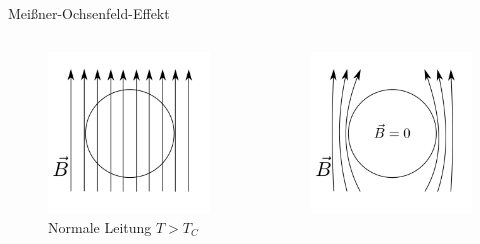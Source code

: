\begin{frame}{Meißner-Ochsenfeld-Effekt}
\begin{columns}
\begin{column}{0.49\textwidth}
  \begin{figure}
    \includegraphics[width = \textwidth]{supra_1.pdf}
    \caption{Normale Leitung $T > T_{C}$}
    \label{fig: bfeld_normale_leitung}
  \end{figure}
\end{column}
\begin{column}{0.49\textwidth}
  \begin{figure}
    \includegraphics[width = \textwidth]{supra_2.pdf}

\end{figure}
\end{column}
\end{columns}
\end{frame}
